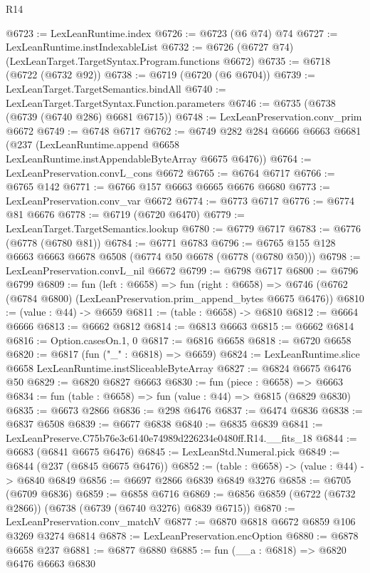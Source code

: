\begin{lexlean}{R14}
\begin{coremodule}
@6723 := LexLeanRuntime.index
@6726 := @6723 (@6 @74) @74
@6727 := LexLeanRuntime.instIndexableList
@6732 := @6726 (@6727 @74) (LexLeanTarget.TargetSyntax.Program.functions @6672)
@6735 := @6718 (@6722 (@6732 @92))
@6738 := @6719 (@6720 (@6 @6704))
@6739 := LexLeanTarget.TargetSemantics.bindAll
@6740 := LexLeanTarget.TargetSyntax.Function.parameters
@6746 := @6735 (@6738 (@6739 (@6740 @286) @6681 @6715))
@6748 := LexLeanPreservation.conv_prim @6672
@6749 := @6748 @6717
@6762 := @6749
    @282
    @284
    @6666
    @6663
    @6681
    (@237 (LexLeanRuntime.append @6658 LexLeanRuntime.instAppendableByteArray @6675 @6476))
@6764 := LexLeanPreservation.convL_cons @6672
@6765 := @6764 @6717
@6766 := @6765 @142
@6771 := @6766 @157 @6663 @6665 @6676 @6680
@6773 := LexLeanPreservation.conv_var @6672
@6774 := @6773 @6717
@6776 := @6774 @81 @6676
@6778 := @6719 (@6720 @6470)
@6779 := LexLeanTarget.TargetSemantics.lookup
@6780 := @6779 @6717
@6783 := @6776 (@6778 (@6780 @81))
@6784 := @6771 @6783
@6796 := @6765 @155 @128 @6663 @6663 @6678 @6508 (@6774 @50 @6678 (@6778 (@6780 @50)))
@6798 := LexLeanPreservation.convL_nil @6672
@6799 := @6798 @6717
@6800 := @6796 @6799
@6809 := fun (left : @6658) =>
  fun (right : @6658) =>
  @6746 (@6762 (@6784 @6800) (LexLeanPreservation.prim_append_bytes @6675 @6476))
@6810 := (value : @44) -> @6659
@6811 := (table : @6658) -> @6810
@6812 := @6664 @6666
@6813 := @6662 @6812
@6814 := @6813 @6663
@6815 := @6662 @6814
@6816 := Option.casesOn.{1, 0}
@6817 := @6816 @6658
@6818 := @6720 @6658
@6820 := @6817 (fun ("_" : @6818) => @6659)
@6824 := LexLeanRuntime.slice @6658 LexLeanRuntime.instSliceableByteArray
@6827 := @6824 @6675 @6476 @50
@6829 := @6820 @6827 @6663
@6830 := fun (piece : @6658) => @6663
@6834 := fun (table : @6658) => fun (value : @44) => @6815 (@6829 @6830)
@6835 := @6673 @2866
@6836 := @298 @6476
@6837 := @6474 @6836
@6838 := @6837 @6508
@6839 := @6677 @6838
@6840 := @6835 @6839
@6841 := LexLeanPreserve.C75b76e3c6140e74989d226234e0480ff.R14.__fits_18
@6844 := @6683 (@6841 @6675 @6476)
@6845 := LexLeanStd.Numeral.pick
@6849 := @6844 (@237 (@6845 @6675 @6476))
@6852 := (table : @6658) -> (value : @44) -> @6840 @6849
@6856 := @6697 @2866 @6839 @6849 @3276
@6858 := @6705 (@6709 @6836)
@6859 := @6858 @6716
@6869 := @6856 @6859 (@6722 (@6732 @2866)) (@6738 (@6739 (@6740 @3276) @6839 @6715))
@6870 := LexLeanPreservation.conv_matchV
@6877 := @6870 @6818 @6672 @6859 @106 @3269 @3274 @6814
@6878 := LexLeanPreservation.encOption
@6880 := @6878 @6658 @237
@6881 := @6877 @6880
@6885 := fun (__a : @6818) => @6820 @6476 @6663 @6830

\end{coremodule}
\end{lexlean}
